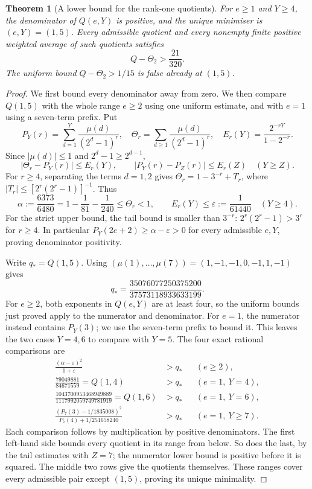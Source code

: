 \documentclass[11pt]{article}
\theoremstyle{plain}
\newtheorem{theorem}[thm]{Theorem}
\theoremstyle{definition}
\theoremstyle{remark}
\begin{document}
\begin{theorem}[A lower bound for the rank-one quotients]\label{res:rankonefloor}
For $e\ge1$ and $Y\ge4$, the denominator of $Q(e,Y)$ is positive, and the
unique minimiser is $(e,Y)=(1,5)$. Every admissible quotient and every
nonempty finite positive weighted average of such quotients satisfies
\[
 Q-\Theta_2>\frac{21}{320}.
\]
The uniform bound $Q-\Theta_2>1/15$ is false already at $(1,5)$.
\end{theorem}
\begin{proof}
We first bound every denominator away from zero. We then compare
$Q(1,5)$ with the whole range $e\ge2$ using one uniform estimate,
and with $e=1$ using a seven-term prefix. Put
\[
 P_Y(r)=\sum_{d=1}^{Y}\frac{\mu(d)}{(2^d-1)^r},\quad
 \Theta_r=\sum_{d\ge1}\frac{\mu(d)}{(2^d-1)^r},\quad
 E_r(Y)=\frac{2^{-rY}}{1-2^{-r}}.
\]
Since $|\mu(d)|\le1$ and $2^d-1\ge2^{d-1}$,
\[
 |\Theta_r-P_Y(r)|\le E_r(Y),\qquad
 |P_Y(r)-P_Z(r)|\le E_r(Z)\quad(Y\ge Z).
\]
For $r\ge4$, separating the terms $d=1,2$ gives
$\Theta_r=1-3^{-r}+T_r$, where
$|T_r|\le[2^r(2^r-1)]^{-1}$. Thus
\[
 \alpha:=\frac{6373}{6480}=1-\frac1{81}-\frac1{240}
 \le\Theta_r<1,
 \qquad E_r(Y)\le\varepsilon:=\frac1{61440}\quad(Y\ge4).
\]
For the strict upper bound, the tail bound is smaller than $3^{-r}$:
$2^r(2^r-1)>3^r$ for $r\ge4$.
In particular $P_Y(2e+2)\ge\alpha-\varepsilon>0$ for every admissible
$e,Y$, proving denominator positivity.

Write $q_*=Q(1,5)$. Using
$(\mu(1),\ldots,\mu(7))=(1,-1,-1,0,-1,1,-1)$ gives
\[
 q_* = \frac{35076077250375200}{37573118933633199}.
\]
For $e\ge2$, both exponents in $Q(e,Y)$ are at least four, so the
uniform bounds just proved apply to the numerator and denominator.
For $e=1$, the numerator instead contains $P_Y(3)$; we use the
seven-term prefix to bound it. This leaves the two cases $Y=4,6$
to compare with $Y=5$. The four exact rational comparisons are
\begin{align*}
 \frac{(\alpha-\varepsilon)^2}{1+\varepsilon}&>q_*
       &&(e\ge2),\\
 \frac{79049881}{84671559}=Q(1,4)&>q_*
       &&(e=1,\ Y=4),\\
 \frac{1043700953468949889}{1117992059749781919}=Q(1,6)&>q_*
       &&(e=1,\ Y=6),\\
 \frac{(P_7(3)-1/1835008)^2}{P_7(4)+1/251658240}&>q_*
       &&(e=1,\ Y\ge7).
\end{align*}
Each comparison follows by multiplication by positive denominators.
The first left-hand side bounds every quotient in its range from
below. So does the last, by the tail estimates with $Z=7$; the
numerator lower bound is positive before it is squared. The middle
two rows give the quotients themselves. These ranges cover every
admissible pair except $(1,5)$, proving its unique minimality.


\end{proof}
\end{document}

